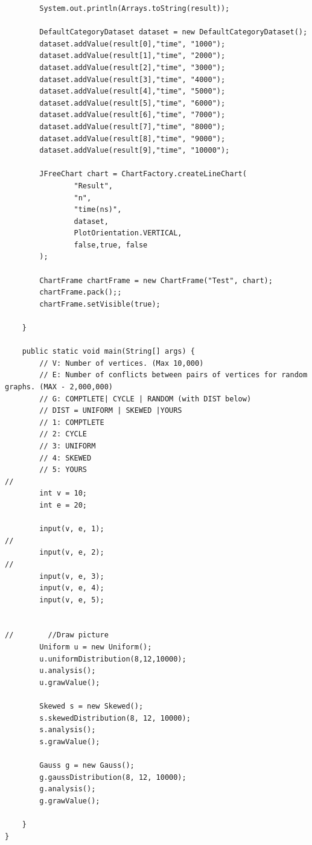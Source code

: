 \documentclass{article}
\begin{document}
\begin{verbatim}
        System.out.println(Arrays.toString(result));

        DefaultCategoryDataset dataset = new DefaultCategoryDataset();
        dataset.addValue(result[0],"time", "1000");
        dataset.addValue(result[1],"time", "2000");
        dataset.addValue(result[2],"time", "3000");
        dataset.addValue(result[3],"time", "4000");
        dataset.addValue(result[4],"time", "5000");
        dataset.addValue(result[5],"time", "6000");
        dataset.addValue(result[6],"time", "7000");
        dataset.addValue(result[7],"time", "8000");
        dataset.addValue(result[8],"time", "9000");
        dataset.addValue(result[9],"time", "10000");

        JFreeChart chart = ChartFactory.createLineChart(
                "Result",
                "n",
                "time(ns)",
                dataset,
                PlotOrientation.VERTICAL,
                false,true, false
        );

        ChartFrame chartFrame = new ChartFrame("Test", chart);
        chartFrame.pack();;
        chartFrame.setVisible(true);

    }

    public static void main(String[] args) {
        // V: Number of vertices. (Max 10,000)
        // E: Number of conflicts between pairs of vertices for random graphs. (MAX - 2,000,000)
        // G: COMPTLETE| CYCLE | RANDOM (with DIST below)
        // DIST = UNIFORM | SKEWED |YOURS
        // 1: COMPTLETE
        // 2: CYCLE
        // 3: UNIFORM
        // 4: SKEWED
        // 5: YOURS
//
        int v = 10;
        int e = 20;

        input(v, e, 1);
//
        input(v, e, 2);
//
        input(v, e, 3);
        input(v, e, 4);
        input(v, e, 5);


//        //Draw picture
        Uniform u = new Uniform();
        u.uniformDistribution(8,12,10000);
        u.analysis();
        u.grawValue();

        Skewed s = new Skewed();
        s.skewedDistribution(8, 12, 10000);
        s.analysis();
        s.grawValue();

        Gauss g = new Gauss();
        g.gaussDistribution(8, 12, 10000);
        g.analysis();
        g.grawValue();

    }
}
\end{verbatim}
\end{document}

